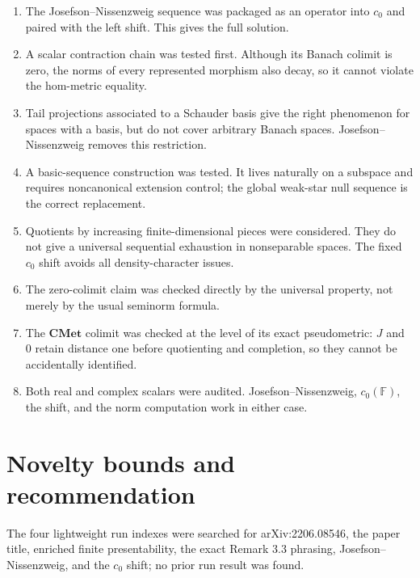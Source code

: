 \documentclass[11pt]{article}
\newcommand{\CMet}{\mathbf{CMet}}
\newcommand{\F}{\mathbb F}
\begin{document}
\begin{enumerate}[leftmargin=*,label=\textbf{Route \arabic*.}]
\item The Josefson--Nissenzweig sequence was packaged as an operator into
$c_0$ and paired with the left shift.  This gives the full solution.

\item A scalar contraction chain was tested first.  Although its Banach
colimit is zero, the norms of every represented morphism also decay, so it
cannot violate the hom-metric equality.

\item Tail projections associated to a Schauder basis give the right
phenomenon for spaces with a basis, but do not cover arbitrary Banach spaces.
Josefson--Nissenzweig removes this restriction.

\item A basic-sequence construction was tested.  It lives naturally on a
subspace and requires noncanonical extension control; the global weak-star
null sequence is the correct replacement.

\item Quotients by increasing finite-dimensional pieces were considered.
They do not give a universal sequential exhaustion in nonseparable spaces.
The fixed $c_0$ shift avoids all density-character issues.

\item The zero-colimit claim was checked directly by the universal property,
not merely by the usual seminorm formula.

\item The $\CMet$ colimit was checked at the level of its exact pseudometric:
$J$ and $0$ retain distance one before quotienting and completion, so they
cannot be accidentally identified.

\item Both real and complex scalars were audited.  Josefson--Nissenzweig,
$c_0(\F)$, the shift, and the norm computation work in either case.
\end{enumerate}

\section{Novelty bounds and recommendation}

The four lightweight run indexes were searched for arXiv:2206.08546, the
paper title, enriched finite presentability, the exact Remark 3.3 phrasing,
Josefson--Nissenzweig, and the $c_0$ shift; no prior run result was found.
\end{document}
